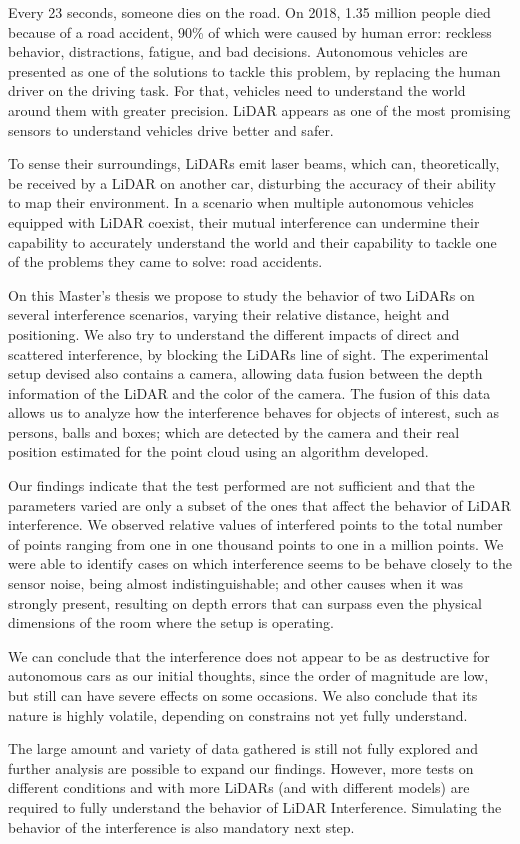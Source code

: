 Every 23 seconds, someone dies on the road.  On 2018, 1.35 million people died because of a road accident, 90\% of which were caused by human error: reckless behavior, distractions, fatigue, and bad decisions. Autonomous vehicles are presented as one of the solutions to tackle this problem, by replacing the human driver on the driving task. For that, vehicles need to understand the world around them with greater precision. LiDAR appears as one of the most promising  sensors to understand vehicles drive better and safer. 

To sense their surroundings, LiDARs emit laser beams, which can, theoretically, be received by a LiDAR on another car, disturbing the accuracy of their ability to map their environment. In a scenario when multiple autonomous vehicles equipped with LiDAR coexist, their mutual interference can undermine their capability to accurately understand the world and their capability to tackle one of the problems they came to solve: road accidents. 

On this Master's thesis we propose to study the behavior of two LiDARs on several interference scenarios, varying their relative distance, height and positioning. We also try to understand the different impacts of direct and scattered interference, by blocking the LiDARs line of sight. The experimental setup devised also contains a camera, allowing data fusion between the depth information of the LiDAR and the color of the camera. The fusion of this data allows us to analyze how the interference behaves for objects of interest, such as persons, balls and boxes; which are detected by the camera and their real position estimated for the point cloud using an algorithm developed.

Our findings indicate that the test performed are not sufficient and that the parameters varied are only a subset of the ones that affect the behavior of LiDAR interference. We observed relative values of interfered points to the total number of points ranging from one in one thousand points to one in a million points. We were able to identify cases on which interference seems to be behave closely to the sensor noise, being almost indistinguishable; and other causes when it was strongly present, resulting on depth errors that can surpass  even the physical dimensions of the room where the setup is operating. 

We can conclude that the interference does not appear to be as destructive for autonomous cars as our initial thoughts, since the order of magnitude are low, but still can have severe effects on some occasions. We also conclude that its nature is highly volatile, depending on constrains not yet fully understand. 

The large amount and variety of data gathered is still not fully explored and further analysis are possible to expand our findings. However, more tests on different conditions and with more LiDARs (and with different  models) are required to fully understand the behavior of LiDAR Interference. Simulating the behavior of the interference is also mandatory next step.




